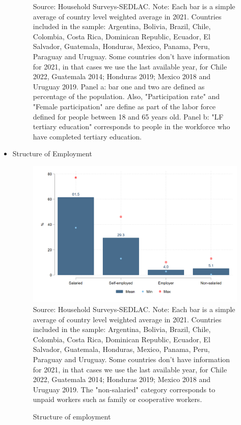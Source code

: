 \documentclass[english]{article}
\begin{document}
\begin{itemize}
\begin{figure}[!htb]
\footnotesize{Source: Household Surveys-SEDLAC.}
\footnotesize{Note: Each bar is a simple average of country level weighted average in 2021. Countries included in the sample: Argentina, Bolivia, Brazil, Chile, Colombia, Costa Rica, Dominican Republic, Ecuador, El Salvador, Guatemala, Honduras, Mexico, Panama, Peru, Paraguay and Uruguay. Some countries don’t have information for 2021, in that cases we use the last available year, for Chile 2022, Guatemala 2014; Honduras 2019; Mexico 2018 and Uruguay 2019. Panel a: bar one and two are defined as percentage of the population. Also, "Participation rate" and "Female participation" are define as part of the labor force defined for people between 18 and 65 years old. Panel b: "LF tertiary education" corresponds to people in the workforce who have completed tertiary education.}

\end{figure}
  
    \item Structure of Employment
    
        \begin{figure}[!htb]
        \justifying
        \caption{Structure of employment}     
        \includegraphics[scale=.3]{latex/figures/Snapshot/Structure of employment.png}
        \label{fig:employment}
        \footnotesize{Source: Household Surveys-SEDLAC.}
        \footnotesize{Note: Each bar is a simple average of country level weighted average in 2021. Countries included in the sample: Argentina, Bolivia, Brazil, Chile, Colombia, Costa Rica, Dominican Republic, Ecuador, El Salvador, Guatemala, Honduras, Mexico, Panama, Peru, Paraguay and Uruguay. Some countries don’t have information for 2021, in that cases we use the last available year, for Chile 2022, Guatemala 2014; Honduras 2019; Mexico 2018 and Uruguay 2019. The "non-salaried" category corresponds to unpaid workers such as family or cooperative workers.}
        \end{figure}


\end{itemize}
\end{document}
